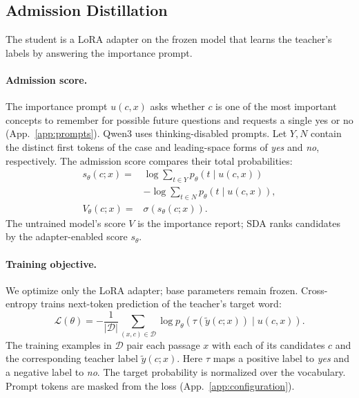 \subsection{Admission Distillation}
\label{sec:student}

The student is a LoRA adapter on the frozen model that learns the
teacher's labels by answering the importance prompt.

\paragraph{Admission score.}
The importance prompt $u(c,x)$ asks whether $c$ is one of the most
important concepts to remember for possible future questions and
requests a single yes or no (App.~\ref{app:prompts}). Qwen3 uses
thinking-disabled prompts. Let $Y,N$ contain the distinct first tokens
of the case and leading-space forms of \emph{yes} and \emph{no},
respectively. The admission score compares their total probabilities:
\begin{equation}
\begin{split}
s_\theta(c;x)={}&\log\!\sum_{t\in Y}p_\theta(t\mid u(c,x))\\
&-\log\!\sum_{t\in N}p_\theta(t\mid u(c,x)),\\
V_\theta(c;x)={}&\sigma\!\left(s_\theta(c;x)\right).
\end{split}
\label{eq:score}
\end{equation}
The untrained model's score $V$ is the importance report; SDA ranks
candidates by the adapter-enabled score $s_\theta$.

\paragraph{Training objective.}
We optimize only the LoRA adapter; base parameters remain frozen.
Cross-entropy trains next-token prediction of the teacher's target word:
\begin{equation}
\mathcal L(\theta)=-\frac{1}{|\mathcal D|}
\sum_{(x,c)\in\mathcal D}
\log p_\theta\!\left(\tau(\tilde y(c;x))\mid u(c,x)\right).
\label{eq:loss}
\end{equation}
The training examples in $\mathcal D$ pair each passage $x$ with each of
its candidates $c$ and the corresponding teacher label $\tilde y(c;x)$.
Here $\tau$ maps a positive label to \emph{yes} and a negative label to
\emph{no}. The target probability is normalized over the vocabulary.
Prompt tokens are masked from the loss
(App.~\ref{app:configuration}).

